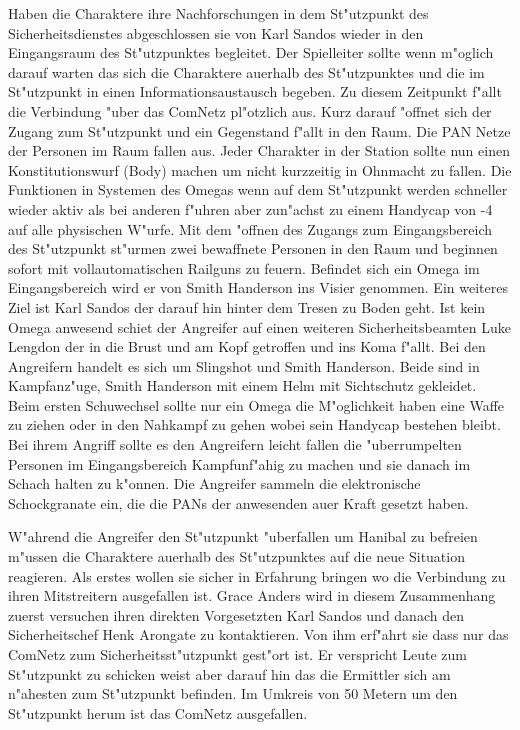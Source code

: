 

Haben die Charaktere ihre Nachforschungen in dem St"utzpunkt des Sicherheitsdienstes abgeschlossen sie von Karl Sandos wieder in den Eingangsraum des St"utzpunktes begleitet. Der Spielleiter sollte wenn m"oglich darauf warten das sich die Charaktere au\3erhalb des St"utzpunktes und die im St"utzpunkt in einen Informationsaustausch begeben. Zu diesem Zeitpunkt f"allt die Verbindung "uber das ComNetz pl"otzlich aus. Kurz darauf "offnet sich der Zugang zum St"utzpunkt und ein Gegenstand f"allt in den Raum. Die PAN Netze der Personen im Raum fallen aus. Jeder Charakter in der Station sollte nun einen Konstitutionswurf (Body) machen um nicht kurzzeitig in Ohnmacht zu fallen. Die Funktionen in Systemen des Omegas wenn auf dem St"utzpunkt werden schneller wieder aktiv als bei anderen f"uhren aber zun"achst zu einem Handycap von -4 auf alle physischen W"urfe. Mit dem "offnen des Zugangs zum Eingangsbereich des St"utzpunkt st"urmen zwei bewaffnete Personen in den Raum und beginnen sofort mit vollautomatischen Railguns zu feuern. Befindet sich ein Omega im Eingangsbereich wird er von
Smith Handerson ins Visier genommen. Ein weiteres Ziel ist Karl Sandos der darauf hin hinter dem Tresen zu Boden geht. Ist kein Omega anwesend schie\3t der Angreifer auf einen weiteren Sicherheitsbeamten Luke Lengdon der in die Brust und am Kopf getroffen und ins Koma f"allt. Bei den Angreifern handelt es sich um Slingshot und Smith Handerson. Beide sind in Kampfanz"uge, Smith Handerson mit einem Helm mit Sichtschutz gekleidet. Beim ersten Schu\3wechsel sollte nur ein Omega die M"oglichkeit haben eine Waffe zu ziehen oder in den Nahkampf zu gehen wobei sein Handycap bestehen bleibt. Bei ihrem Angriff sollte es den Angreifern leicht fallen die "uberrumpelten Personen im Eingangsbereich Kampfunf"ahig zu machen und sie danach im Schach halten zu k"onnen. Die Angreifer sammeln die elektronische Schockgranate ein, die die PANs der anwesenden au\3er Kraft gesetzt haben.

W"ahrend die Angreifer den St"utzpunkt "uberfallen um Hanibal zu befreien m"ussen die Charaktere au\3erhalb des St"utzpunktes auf die neue Situation reagieren. Als erstes wollen sie sicher in Erfahrung bringen wo die Verbindung zu ihren Mitstreitern ausgefallen ist. Grace Anders wird in diesem Zusammenhang zuerst versuchen ihren direkten Vorgesetzten Karl Sandos und danach den Sicherheitschef Henk Arongate zu kontaktieren. Von ihm erf"ahrt sie dass nur das ComNetz zum Sicherheitsst"utzpunkt gest"ort ist. Er verspricht Leute zum St"utzpunkt zu schicken weist aber darauf hin das die Ermittler sich am n"ahesten zum St"utzpunkt befinden. Im Umkreis von 50 Metern um den St"utzpunkt herum ist das ComNetz ausgefallen. 

